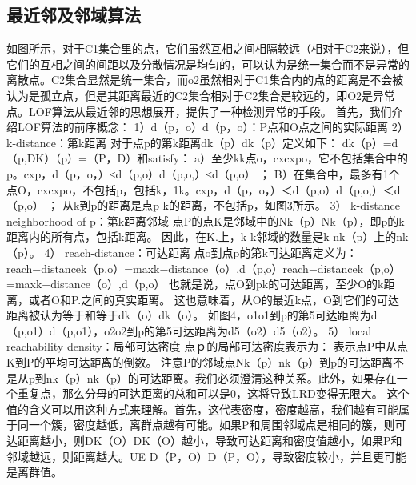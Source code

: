 \documentclass[a4paper,AutoFakeBold,oneside,12pt]{book}
\begin{document}
\subsection{最近邻及邻域算法}
如图所示，对于C1集合里的点，它们虽然互相之间相隔较远（相对于C2来说），但它们的互相之间的间距以及分散情况是均匀的，可以认为是统一集合而不是异常的离散点。C2集合显然是统一集合，而o2虽然相对于C1集合内的点的距离是不会被认为是孤立点，但是其距离最近的C2集合相对于C2集合是较远的，即O2是异常点。LOF算法从最近邻的思想展开，提供了一种检测异常的手段。
	首先，我们介绍LOF算法的前序概念：
	1）d（p，o）d（p，o）：P点和O点之间的实际距离
	2） k-distance：第k距离
	对于点p的第k距离dk（p）dk（p）定义如下：
	dk（p）=d（p,DK）（p）=（P，D）和satisfy：
	a）至少kk点o，c{xc{xp}o，它不包括集合中的p。c{xp}，d（p，o，）≤d（p,o）d（p,o,）≤d（p,o） ；
	B）在集合中，最多有1个点O，c{xc{xp}o，不包括p，包括k，1k。c{xp}，d（p，o，）＜d（p,o）d（p,o,）＜d（p,o） ；
	从k到p的距离是点p k的距离，不包括p，如图3所示。
	3） k-distance neighborhood of p：第k距离邻域
	点P的点K是邻域中的Nk（p）Nk（p），即p的k距离内的所有点，包括k距离。
	因此，在K.上，k k邻域的数量是k nk（p）上的nk（p）。
	4） reach-distance：可达距离
	点o到点p的第k可达距离定义为：
	reach−distancek（p,o）=max{k−distance（o）,d（p,o）}reach−distancek（p,o）=max{k−distance（o）,d（p,o）}
	也就是说，点O到pk的可达距离，至少O的k距离，或者O和P.之间的真实距离。
	这也意味着，从O的最近k点，O到它们的可达距离被认为等于和等于dk（o）dk（o）。
	如图4，o1o1到p的第5可达距离为d（p,o1）d（p,o1），o2o2到p的第5可达距离为d5（o2）d5（o2）。
	5） local reachability density：局部可达密度
	点ｐ的局部可达密度表示为：
	表示点P中从点K到P的平均可达距离的倒数。
	注意P的邻域点Nk（p）nk（p）到p的可达距离不是从p到nk（p）nk（p）的可达距离。我们必须澄清这种关系。此外，如果存在一个重复点，那么分母的可达距离的总和可以是0，这将导致LRD变得无限大。
	这个值的含义可以用这种方式来理解。首先，这代表密度，密度越高，我们越有可能属于同一个簇，密度越低，离群点越有可能。如果P和周围邻域点是相同的簇，则可达距离越小，则DK（O）DK（O）越小，导致可达距离和密度值越小，如果P和邻域越远，则距离越大。UE D（P，O）D（P，O），导致密度较小，并且更可能是离群值。
}}
\end{document}
